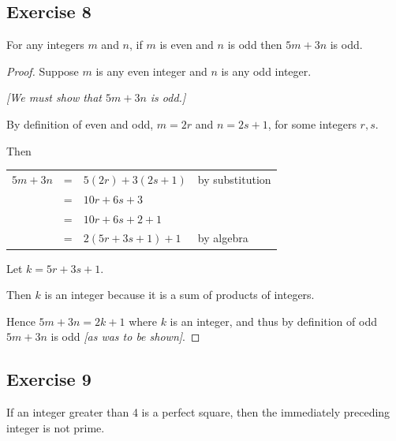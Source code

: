 \documentclass[14pt]{extarticle}
\newcommand{\cy}{\color{cyan}}
\begin{document}
\subsection{Exercise 8}
For any integers $m$ and $n$, if $m$ is even and $n$ is odd
then $5m + 3n$ is odd.

\begin{proof}
Suppose $m$ is any even integer and $n$ is any odd integer.  

{\it [We must show that $5m+3n$ is odd.]}

By definition of even and odd, $m = 2r$ and $n = 2s+1$, for some integers $r, s$. 

Then

\begin{center}
\begin{tabular}{rcll}
$5m+3n$ & = & $5(2r)+3(2s+1)$ & \cy by substitution \\
& = & $10r+6s+3$ & \\
& = & $10r+6s+2+1$ & \\
& = & $2(5r+3s+1)+1$ & \cy by algebra \\
\end{tabular}
\end{center}

Let $k = 5r+3s+1$. 

Then $k$ is an integer because it is a sum of products of integers. 

Hence $5m+3n = 2k+1$ where $k$ is an integer, and thus by definition of odd $5m+3n$ is odd {\it [as was to be shown]}.
\end{proof}

\subsection{Exercise 9}
If an integer greater than 4 is a perfect square, then the immediately preceding integer is not prime.
\end{document}
